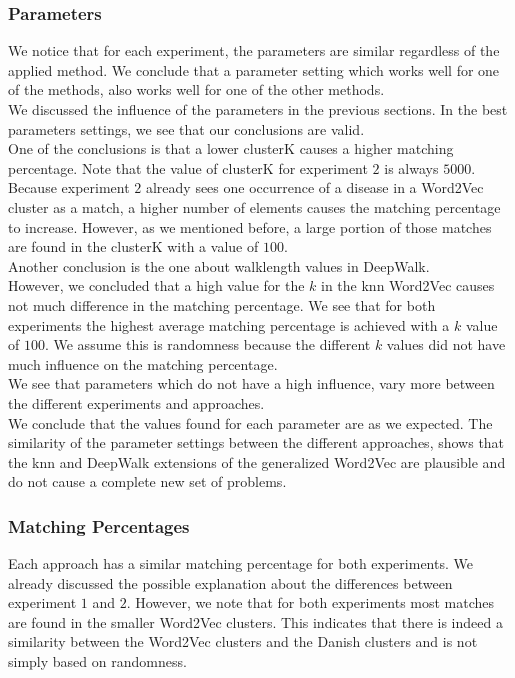 \subsubsection{Parameters}

We notice that for each experiment, the parameters are similar regardless of the applied method. We conclude that a parameter setting which works well for one of the methods, also works well for one of the other methods. \\

We discussed the influence of the parameters in the previous sections. In the best parameters settings, we see that our conclusions are valid. \\
One of the conclusions is that a lower clusterK causes a higher matching percentage. Note that the value of clusterK for experiment $2$ is always $5000$. Because experiment $2$ already sees one occurrence of a disease in a Word2Vec cluster as a match, a higher number of elements causes the matching percentage to increase. However, as we mentioned before, a large portion of those matches are found in the clusterK with a value of $100$. \\
Another conclusion is the one about walklength values in DeepWalk. \\

However, we concluded that a high value for the $k$ in the knn Word2Vec causes not much difference in the matching percentage. We see that for both experiments the highest average matching percentage is achieved with a $k$ value of $100$. We assume this is randomness because the different $k$ values did not have much influence on the matching percentage. \\ 
We see that parameters which do not have a high influence, vary more between the different experiments and approaches. \\

We conclude that the values found for each parameter are as we expected. The similarity of the parameter settings between the different approaches, shows that the knn and DeepWalk extensions of the generalized Word2Vec are plausible and do not cause a complete new set of problems.

\subsubsection{Matching Percentages}

Each approach has a similar matching percentage for both experiments. We already discussed the possible explanation about the differences between experiment $1$ and $2$. However, we note that for both experiments most matches are found in the smaller Word2Vec clusters. This indicates that there is indeed a similarity between the Word2Vec clusters and the Danish clusters and is not simply based on randomness. \\

